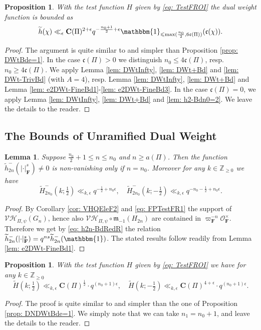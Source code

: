 \documentclass[A4]{amsart}
\def\leq{\leqslant}
\def\geq{\geqslant}
\newtheorem{lemma}      [theorem]{Lemma}
\newtheorem{proposition}[theorem]{Proposition}
\numberwithin{equation}{section} \everymath{\displaystyle}
\newcommand{\Z}{\mathbb{Z}}
\newcommand{\id}{\mathbbm{1}}
\newcommand{\F}{\mathbf{F}}
\newcommand{\vO}{\mathcal{O}}
\newcommand{\norm}[1][\cdot]{\lvert #1 \rvert}
\newcommand{\Mult}{\mathfrak{m}}
\newcommand{\VorH}{\mathcal{VH}}
\newcommand{\Cond}{\mathbf{C}}
\newcommand{\cond}{\mathfrak{c}}
\begin{document}
\begin{proposition} \label{prop: DWtBde=2}
	With the test function $H$ given by \eqref{eq: TestFROI} the dual weight function is bounded as
	$$ \widetilde{h}(\chi) \ll_{\epsilon} \Cond(\Pi)^{2+\epsilon} q^{-\frac{n_0+1}{2}+\epsilon} \id_{\leq \max(\frac{n_0}{2},6\cond(\Pi))}(\cond(\chi)). $$
\end{proposition}
\begin{proof}
	The argument is quite similar to and simpler than Proposition \ref{prop: DWtBde=1}. In the case $\cond(\Pi) > 0$ we distinguish $n_0 \leq 4\cond(\Pi)$, resp. $n_0 \geq 4\cond(\Pi)$. We apply Lemma \ref{lem: DWtInfty}, \ref{lem: DWt+Bd} and \ref{lem: DWt-TrivBd} (with $A=4$), resp. Lemma \ref{lem: DWtInfty}, \ref{lem: DWt+Bd} and Lemma \ref{lem: e2DWt-FineBd1}-\ref{lem: e2DWt-FineBd3}. In the case $\cond(\Pi)=0$, we apply Lemma \ref{lem: DWtInfty}, \ref{lem: DWt+Bd} and \ref{lem: h2-Bdn0=2}. We leave the details to the reader.
\end{proof}
	
	
	\subsection{The Bounds of Unramified Dual Weight}
	
\begin{lemma} \label{lem: e2DNDWt-FineBd1}
	Suppose $\tfrac{n_0}{2} + 1 \leq n \leq n_0$ and $n \geq a(\Pi)$. Then the function $\widetilde{h}_{2n}^-(\norm_{\F}^s) \neq 0$ is non-vanishing only if $n=n_0$. Moreover for any $k \in \Z_{\geq 0}$ we have
	$$ \widetilde{H}_{2n_0}^-(k; \tfrac{1}{2}) \ll_{k,\epsilon} q^{-\frac{1}{2}+n_0 \epsilon}, \quad \widetilde{H}_{2n_0}^-(k; -\tfrac{1}{2}) \ll_{k,\epsilon} q^{-n_0-\frac{1}{2}+n_0\epsilon}. $$
\end{lemma}
\begin{proof}
	By Corollary \ref{cor: VHQEleF2} and \eqref{eq: FPTestFR1} the support of $\VorH_{\Pi,\psi}(G_n)$, hence also $\VorH_{\Pi,\psi} \circ \Mult_{-1} (H_{2n})$ are contained in $\varpi_{\F}^{-n} \vO_{\F}^{\times}$. Therefore we get by \eqref{eq: h2n-BdRedR} the relation $\widetilde{h}_{2n}^-(\norm_{\F}^s) = q^{ns} \widetilde{h}_{2n}^-(\id)$. The stated results follow readily from Lemma \ref{lem: e2DWt-FineBd1}.
\end{proof}

\begin{proposition} \label{prop: DNDWtBde=2}
	With the test function $H$ given by \eqref{eq: TestFROI} we have for any $k \in \Z_{\geq 0}$
	$$ \widetilde{H}(k; \tfrac{1}{2}) \ll_{k,\epsilon} \Cond(\Pi)^{\frac{1}{2}} \cdot q^{(n_0+1) \epsilon}, \quad \widetilde{H}(k; -\tfrac{1}{2}) \ll_{k,\epsilon} \Cond(\Pi)^{4+\epsilon} \cdot q^{(n_0+1) \epsilon}. $$
\end{proposition}
\begin{proof}
	The proof is quite similar to and simpler than the one of Proposition \ref{prop: DNDWtBde=1}. We simply note that we can take $n_1=n_0+1$, and leave the details to the reader.
\end{proof}
\end{document}
